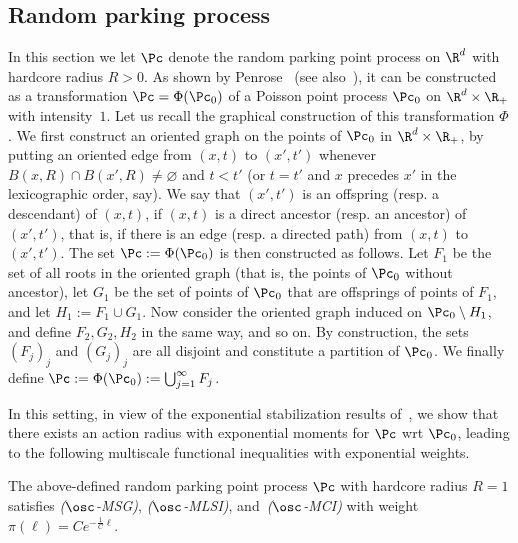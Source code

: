 \subsection{Random parking process}\label{chap:RPM}
In this section we let $\Pc$ denote the random parking point process on $\R^d$ with hardcore radius $R>0$. As shown by Penrose~\cite{Penrose-01} (see also~\cite[Section~2.1]{Gloria-Penrose-13}), it can be constructed as a transformation $\Pc=\Phi(\Pc_0)$ of a Poisson point process $\Pc_0$ on $\R^d\times\R_+$ with intensity~$1$. Let us recall the graphical construction of this transformation $\Phi$. We first construct an oriented graph on the points of $\Pc_0$ in $\R^d\times\R_+$, by putting an oriented edge from $(x,t)$ to $(x',t')$ whenever $B(x,R)\cap B(x',R)\ne\varnothing$ and $t<t'$ (or $t=t'$ and $x$ precedes $x'$ in the lexicographic order, say). We say that $(x',t')$ is an offspring (resp. a descendant) of $(x,t)$, if $(x,t)$ is a direct ancestor (resp. an ancestor) of $(x',t')$, that is, if there is an edge (resp. a directed path) from $(x,t)$ to $(x',t')$. The set $\Pc:=\Phi(\Pc_0)$ is then constructed as follows. Let $F_1$ be the set of all roots in the oriented graph (that is, the points of $\Pc_0$ without ancestor), let $G_1$ be the set of points of $\Pc_0$ that are offsprings of points of $F_1$, and let $H_1:=F_1\cup G_1$. Now consider the oriented graph induced on $\Pc_0\setminus H_1$, and define $F_2,G_2,H_2$ in the same way, and so on. By construction, the sets $(F_j)_j$ and $(G_j)_j$ are all disjoint and constitute a partition of $\Pc_0$. We finally define $\Pc:=\Phi(\Pc_0):=\bigcup_{j=1}^\infty F_j$.

In this setting, in view of the exponential stabilization results of~\cite{Schreiber-Penrose-Yukich-07}, we show that there exists an action radius with exponential moments for $\Pc$ wrt $\Pc_0$, leading to the following multiscale functional inequalities with exponential weights.

\begin{prop}\label{prop:rpm}
The above-defined random parking point process $\Pc$ with hardcore radius $R=1$ satisfies
\emph{($\osc$-MSG)}, \emph{($\osc$-MLSI)}, and~\emph{($\osc$-MCI)} with weight $\pi(\ell)=Ce^{-\frac1{C}\ell}$.
\end{prop}



